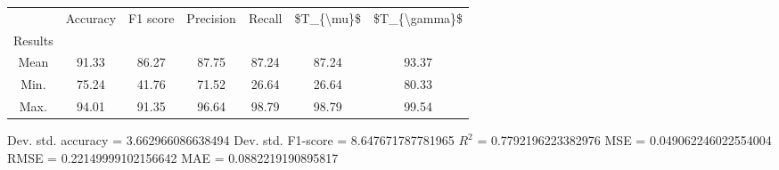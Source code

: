 \begin{tabular}{|c|c|c|c|c|c|c|}
\toprule
{} &  Accuracy &  F1 score &  Precision &  Recall &  \$T\_\{\textbackslash mu\}\$ &  \$T\_\{\textbackslash gamma\}\$ \\
Results &           &           &            &         &            &               \\
\hline
Mean    &     91.33 &     86.27 &      87.75 &   87.24 &      87.24 &         93.37 \\
Min.    &     75.24 &     41.76 &      71.52 &   26.64 &      26.64 &         80.33 \\
Max.    &     94.01 &     91.35 &      96.64 &   98.79 &      98.79 &         99.54 \\
\bottomrule
\end{tabular}

 Dev. std. accuracy = 3.662966086638494
 Dev. std. F1-score = 8.647671787781965
 $R^2$ = 0.7792196223382976
 MSE = 0.049062246022554004
 RMSE = 0.22149999102156642
 MAE = 0.0882219190895817